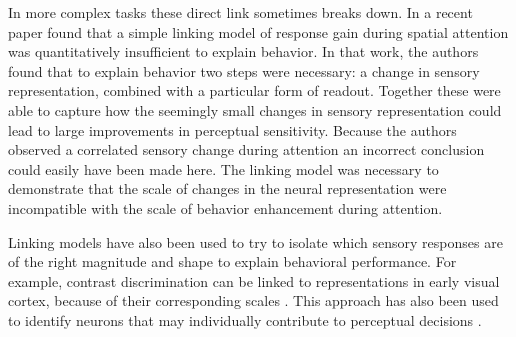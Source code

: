 In more complex tasks these direct link sometimes breaks down. In a recent paper \citet{Pestilli2011-gi} found that a simple linking model of response gain during spatial attention was quantitatively insufficient to explain behavior. In that work, the authors found that to explain behavior two steps were necessary: a change in sensory representation, combined with a particular form of readout. Together these were able to capture how the seemingly small changes in sensory representation could lead to large improvements in perceptual sensitivity. Because the authors observed a correlated sensory change during attention an incorrect conclusion could easily have been made here. The linking model was necessary to demonstrate that the scale of changes in the neural representation were incompatible with the scale of behavior enhancement during attention.

Linking models have also been used to try to isolate which sensory responses are of the right magnitude and shape to explain behavioral performance. For example, contrast discrimination can be linked to representations in early visual cortex, because of their corresponding scales \citep{Boynton1999-jd}. This approach has also been used to identify neurons that may individually contribute to perceptual decisions \citep{Newsome1989-fr}.